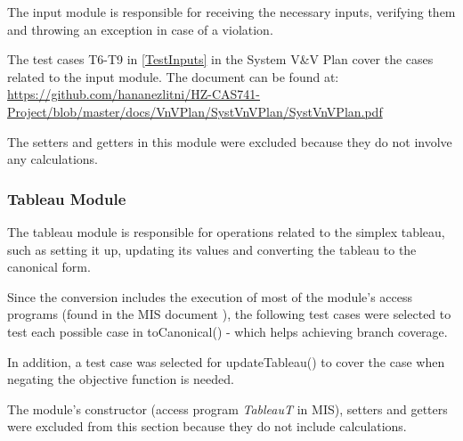 \documentclass[12pt, titlepage]{article}
\begin{document}
The input module is responsible for receiving the necessary inputs, verifying 
them and throwing an exception in case of a violation.

The test cases T6-T9 in \ref{TestInputs} in the System V\&V Plan cover the 
cases related to the input module. The document can be found at: 
\url{https://github.com/hananezlitni/HZ-CAS741-Project/blob/master/docs/VnVPlan/SystVnVPlan/SystVnVPlan.pdf}

The setters and getters in this module were excluded because they do not 
involve any calculations.


\subsubsection{Tableau Module}

The tableau module is responsible for operations related to the simplex 
tableau, such as setting it up, updating its values and converting the tableau 
to the canonical form. 

Since the conversion includes the execution of most of the module's access 
programs (found in the MIS document \cite{losms-mis}), the following test cases 
were selected to test each possible case in toCanonical() - which helps 
achieving branch coverage.

In addition, a test case was selected for updateTableau() to cover the case 
when negating the objective function is needed.

The module's constructor (access program \textit{TableauT} in MIS), setters 
and getters were excluded from this section because they do not include 
calculations.
\end{document}

